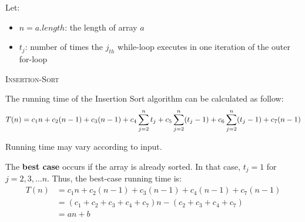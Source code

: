      \par Let:
      \begin{itemize}
        \item $n = a.length$: the length of array $a$
        \item $t_{j}$: number of times the $j_{th}$ while-loop executes in one iteration
          of the outer for-loop
      \end{itemize}
      \begin{algorithm}
        \caption*{\textsc{Insertion-Sort}}
        \begin{algorithmic}[1]
          \Statex
             
               
               
              \ENDWHILE
            \ENDFOR
          \EndFunction
        \end{algorithmic}
      \end{algorithm}
      \par The running time of the Insertion Sort algorithm can be calculated as follow:
      \begin{align*}
        T(n) = c_{1}n
          + c_{2}(n - 1)
          + c_{3}(n - 1)
          + c_{4} \sum\limits _{j = 2}^{n} t_{j}
          + c_{5} \sum\limits _{j = 2}^{n} (t_{j} - 1)
          + c_{6} \sum\limits _{j = 2}^{n} (t_{j} - 1)
          + c_{7}(n - 1)
      \end{align*}
      \par Running time may vary according to input.
      \par The \textbf{best case} occurs if the array is already sorted.
      In that case, $t_{j} = 1$ for $j = 2, 3, \ldots n$. Thus, the best-case running time
      is:
      \begin{align*}
        T(n) &= c_{1}n
          + c_{2}(n - 1)
          + c_{3}(n - 1)
          + c_{4}(n - 1)
          + c_{7}(n - 1) \\
          &= (c_{1} + c_{2} + c_{3} + c_{4} + c_{7})n
            - (c_{2} + c_{3} + c_{4} + c_{7}) \\
          &= an + b
      \end{align*}

